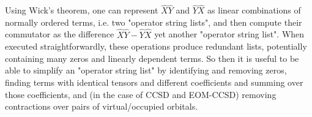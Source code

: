 \documentclass{report}
\begin{document}
Using Wick's theorem, one can represent $\hat{X} \hat{Y}$ and $\hat{Y} \hat{X}$ as linear combinations of normally ordered terms,
i.e. two "operator string lists", and then compute their commutator as the difference $\hat{X} \hat{Y} - \hat{Y} \hat{X}$ yet another
"operator string list".
When executed straightforwardly, these operations produce redundant lists, potentially containing many zeros and linearly dependent terms.
So then it is useful to be able to simplify an "operator string list" by identifying and removing zeros, finding terms with identical tensors and different coefficients and summing over those coefficients, and (in the case of CCSD and EOM-CCSD) removing contractions over pairs of
virtual/occupied orbitals.
\end{document}
